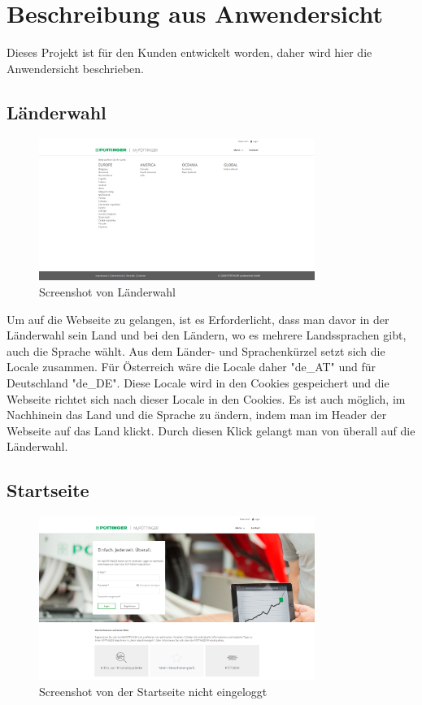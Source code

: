 \chapter{Beschreibung aus Anwendersicht} \label{anwendersicht}
Dieses Projekt ist für den Kunden entwickelt worden, daher wird hier die Anwendersicht beschrieben.
\section{Länderwahl}
\begin{figure}[h]
	\centerline{
		\includegraphics[width=0.8\textwidth]{./grafiken/erm_country_selection.png}
	}
	\vskip0pt
	\caption{Screenshot von Länderwahl} \label{fig:countrySelection}
\end{figure}
Um auf die Webseite zu gelangen, ist es Erforderlicht, dass man davor in der Länderwahl sein Land und bei den Ländern, wo es mehrere Landssprachen gibt, auch die Sprache wählt. Aus dem Länder- und Sprachenkürzel setzt sich die Locale zusammen. Für Österreich wäre die Locale daher "de\_AT" und für Deutschland "de\_DE". Diese Locale wird in den Cookies gespeichert und die Webseite richtet sich nach dieser Locale in den Cookies. Es ist auch möglich, im Nachhinein das Land und die Sprache zu ändern, indem man im Header der Webseite auf das Land klickt. Durch diesen Klick gelangt man von überall auf die Länderwahl.

\section{Startseite}
\begin{figure}[H]
	\centerline{
		\includegraphics[width=0.8\textwidth]{./grafiken/erm_home_not_logged_in_1.png}
	}
	\vskip0pt
	\caption{Screenshot von der Startseite nicht eingeloggt} \label{fig:homeNotLoggedIn}
\end{figure}


